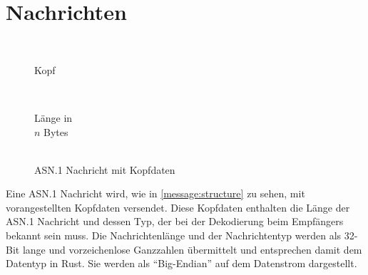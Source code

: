 

\section{Nachrichten}


\begin{wrapfigure}{R}[-1.5em]{.5\textwidth}
	\centering
	\begin{bytefield}[bitwidth=.45em,bitheight=.7em]{32}
		 \\
		
		\begin{rightwordgroup}{Kopf}
			 \\
		\end{rightwordgroup} \\
		
		\begin{rightwordgroup}{Länge in\\\textbf{$n$} Bytes}
			 \\
			\skippedwords \\
		\end{rightwordgroup}
	\end{bytefield}
	\caption{ASN.1 Nachricht mit Kopfdaten}
	\label{message:structure}
\end{wrapfigure}

Eine ASN.1 Nachricht wird, wie in \autoref{message:structure} zu sehen, mit  vorangestellten Kopfdaten versendet.
Diese Kopfdaten enthalten die Länge der ASN.1 Nachricht und dessen Typ, der bei der Dekodierung beim Empfängers bekannt sein muss.
Die Nachrichtenlänge und der Nachrichtentyp werden als 32-Bit lange und vorzeichenlose Ganzzahlen übermittelt und entsprechen damit dem Datentyp  in Rust.
Sie werden als \enquote{Big-Endian} auf dem Datenstrom dargestellt.

